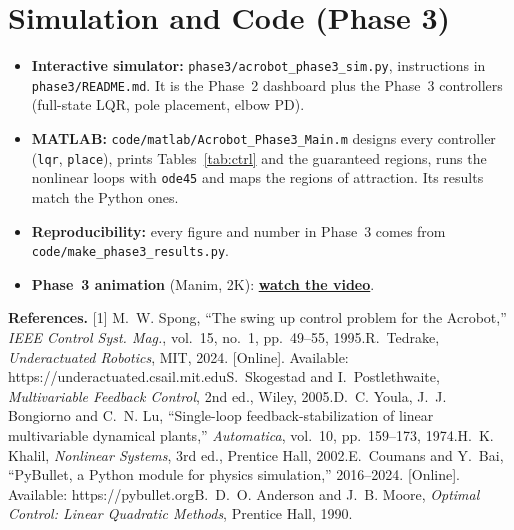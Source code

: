 \documentclass[10pt,letterpaper]{article}
\newenvironment{keep}{\par\noindent\begin{minipage}{\linewidth}}{\end{minipage}\par\smallskip}
\begin{document}
\begin{keep}
\section{Simulation and Code (Phase 3)}
\begin{itemize}
\item \textbf{Interactive simulator:} \texttt{phase3/acrobot\_phase3\_sim.py}, instructions in \texttt{phase3/README.md}. It is the Phase~2 dashboard plus the Phase~3 controllers (full-state LQR, pole placement, elbow PD).
\item \textbf{MATLAB:} \texttt{code/matlab/Acrobot\_Phase3\_Main.m} designs every controller (\texttt{lqr}, \texttt{place}), prints Tables~\ref{tab:ctrl} and the guaranteed regions, runs the nonlinear loops with \texttt{ode45} and maps the regions of attraction. Its results match the Python ones.
\item \textbf{Reproducibility:} every figure and number in Phase~3 comes from \texttt{code/make\_phase3\_results.py}.
\item \textbf{Phase~3 animation} (Manim, 2K): \href{https://drive.google.com/file/d/1c-7Yy664ZP4TCJIeDbrAmFozHC8frao1/view?usp=sharing}{\textcolor{blue!60!black}{\textbf{watch the video}}}.
\end{itemize}
\end{keep}

\begin{keep}
\vspace{6pt}
\begin{singlespace}
{\footnotesize
\textbf{References.}
[1] M.~W. Spong, ``The swing up control problem for the Acrobot,'' \emph{IEEE Control Syst. Mag.}, vol.~15, no.~1, pp.~49--55, 1995.\quad
[2] R.~Tedrake, \emph{Underactuated Robotics}, MIT, 2024. [Online]. Available: https://underactuated.csail.mit.edu\quad
[3] S.~Skogestad and I.~Postlethwaite, \emph{Multivariable Feedback Control}, 2nd ed., Wiley, 2005.\quad
[4] D.~C. Youla, J.~J. Bongiorno and C.~N. Lu, ``Single-loop feedback-stabilization of linear multivariable dynamical plants,'' \emph{Automatica}, vol.~10, pp.~159--173, 1974.\quad
[5] H.~K. Khalil, \emph{Nonlinear Systems}, 3rd ed., Prentice Hall, 2002.\quad
[6] E.~Coumans and Y.~Bai, ``PyBullet, a Python module for physics simulation,'' 2016--2024. [Online]. Available: https://pybullet.org\quad
[7] B.~D.~O. Anderson and J.~B. Moore, \emph{Optimal Control: Linear Quadratic Methods}, Prentice Hall, 1990.\par}
\end{singlespace}
\end{keep}
\end{document}
